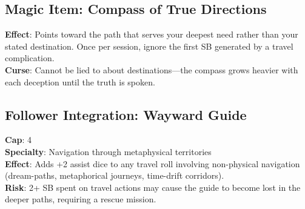 \subsection*{Magic Item: Compass of True Directions}
\textbf{Effect}: Points toward the path that serves your deepest need rather than your stated destination. Once per session, ignore the first SB generated by a travel complication. \\
\textbf{Curse}: Cannot be lied to about destinations---the compass grows heavier with each deception until the truth is spoken.

\subsection*{Follower Integration: Wayward Guide}
\textbf{Cap}: 4 \\
\textbf{Specialty}: Navigation through metaphysical territories \\
\textbf{Effect}: Adds +2 assist dice to any travel roll involving non-physical navigation (dream-paths, metaphorical journeys, time-drift corridors). \\
\textbf{Risk}: 2+ SB spent on travel actions may cause the guide to become lost in the deeper paths, requiring a rescue mission.



